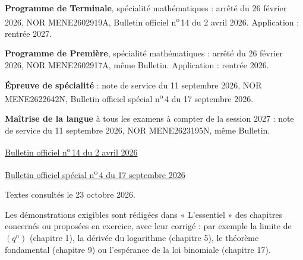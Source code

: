 \begin{minipage}[t]{0.4\linewidth}\vspace{0pt}
\begin{tcolorbox}[enhanced,colback=otNavyTint,colframe=otNavyTint,boxrule=0pt,arc=2mm,left=4.5mm,right=4.5mm,top=3.5mm,bottom=3.5mm,
  fontupper=\fontsize{8.6}{11.6}\selectfont\raggedright]
\textbf{Programme de Terminale}, spécialité mathématiques : arrêté du 26 février 2026, NOR MENE2602919A, Bulletin officiel
n\textsuperscript{o}\,14 du 2 avril 2026. Application : rentrée 2027.\par\vspace{2.5mm}
\textbf{Programme de Première}, spécialité mathématiques : arrêté du 26 février 2026, NOR MENE2602917A, même Bulletin.
Application : rentrée 2026.\par\vspace{2.5mm}
\textbf{Épreuve de spécialité} : note de service du 11 septembre 2026, NOR MENE2622642N, Bulletin officiel spécial
n\textsuperscript{o}\,4 du 17 septembre 2026.\par\vspace{2.5mm}
\textbf{Maîtrise de la langue} à tous les examens à compter de la session 2027 : note de service du 11 septembre 2026,
NOR MENE2623195N, même Bulletin.\par\vspace{3mm}
\href{https://www.education.gouv.fr/bo/2026/Hebdo14}{\textcolor{otNavy}{Bulletin officiel n\textsuperscript{o}\,14 du 2 avril 2026}}\par\vspace{1mm}
\href{https://www.education.gouv.fr/bo/2026/Special4}{\textcolor{otNavy}{Bulletin officiel spécial n\textsuperscript{o}\,4 du 17 septembre 2026}}\par\vspace{2.5mm}
{\color{otMuted}Textes consultés le 23 octobre 2026.}
\end{tcolorbox}
\vspace{3mm}
\begin{tcolorbox}[enhanced,colback=otGreenTint,colframe=otGreenTint,boxrule=0pt,arc=2mm,left=4.5mm,right=4.5mm,top=3.5mm,bottom=3.5mm,
  fontupper=\fontsize{8.6}{11.6}\selectfont\raggedright]
Les démonstrations exigibles sont rédigées dans « L'essentiel » des chapitres concernés ou proposées en exercice, avec leur
corrigé : par exemple la limite de $(q^{n})$ (chapitre 1), la dérivée du logarithme (chapitre 5), le théorème fondamental
(chapitre 9) ou l'espérance de la loi binomiale (chapitre 17).
\end{tcolorbox}
\end{minipage}
\clearpage
